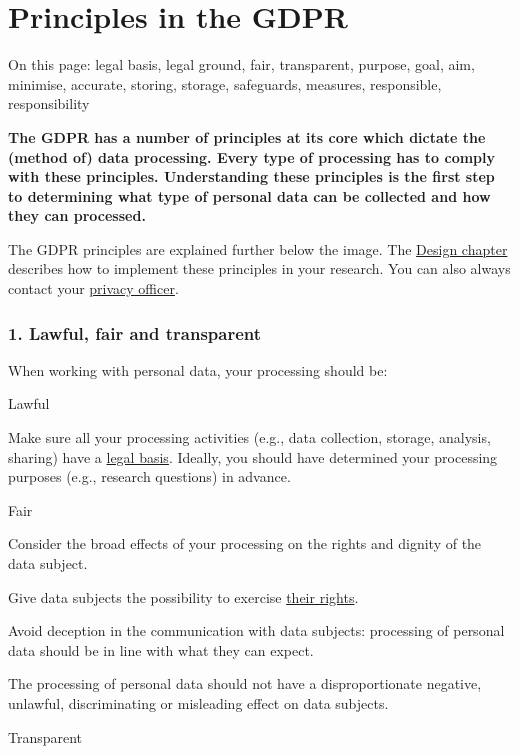 \documentclass[
]{book}
\begin{document}
\hypertarget{gdpr-principles}{%
\section{Principles in the GDPR}\label{gdpr-principles}}

On this page: legal basis, legal ground, fair, transparent, purpose, goal, aim,
minimise, accurate, storing, storage, safeguards, measures, responsible,
responsibility

\textbf{The GDPR has a number of principles at its core which dictate the (method of)
data processing. Every type of processing has to comply with these principles.
Understanding these principles is the first step to determining what type of
personal data can be collected and how they can processed.}

The GDPR principles are explained further below the image. The
\protect\hyperlink{privacy-by-design}{Design chapter} describes how to implement these principles
in your research. You can also always contact your \protect\hyperlink{support}{privacy officer}.

\hypertarget{lawful-fair-and-transparent}{%
\subsubsection{1. Lawful, fair and transparent}\label{lawful-fair-and-transparent}}

When working with personal data, your processing should be:

Lawful

Make sure all your processing activities (e.g., data collection, storage,
analysis, sharing) have a \protect\hyperlink{legal-basis}{legal basis}. Ideally,
you should have determined your processing purposes (e.g., research questions)
in advance.

Fair

Consider the broad effects of your processing on the rights and dignity of the data subject.

Give data subjects the possibility to exercise \protect\hyperlink{data-subject-rights}{their rights}.

Avoid deception in the communication with data subjects: processing of personal data should be in line with what they can expect.

The processing of personal data should not have a disproportionate negative, unlawful, discriminating or misleading effect on data subjects.

Transparent
\end{document}
